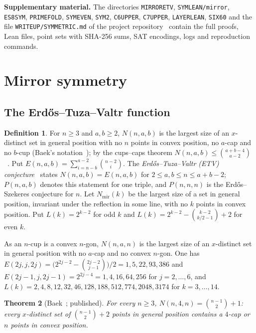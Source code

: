 \documentclass[10pt]{article}
\newtheorem{theorem}{Theorem}[section]
\theoremstyle{definition}
\newtheorem{definition}[theorem]{Definition}
\theoremstyle{remark}
\newcommand{\Nm}{N_{\mathrm{mir}}}
\newcommand{\dirn}[1]{{\upshape\nolinkurl{#1}}}
\begin{document}
\noindent\textbf{Supplementary material.} The directories \dirn{MIRRORETV}, \dirn{SYMLEAN/mirror}, \dirn{ES8SYM},
\dirn{PRIMEFOLD}, \dirn{SYMEVEN}, \dirn{SYM2}, \dirn{C6UPPER}, \dirn{C7UPPER}, \dirn{LAYERLEAN}, \dirn{SIX60} and the file
\dirn{WRITEUP/SYMMETRIC.md} of the project repository~\cite{Supp} contain
the full proofs, Lean files, point sets with SHA-256 sums, SAT encodings, logs and reproduction commands.

\section{Mirror symmetry}\label{sec:mirror}

\subsection{The Erd\H{o}s--Tuza--Valtr function}

\begin{definition}
For $n\ge3$ and $a,b\ge2$, $N(n,a,b)$ is the largest size of an $x$-distinct set in general position with no $n$ points
in convex position, no $a$-cap and no $b$-cup (Baek's notation~\cite[Def.~1.3]{Bae25}); by the cups--caps theorem
$N(n,a,b)\le\binom{a+b-4}{a-2}$~\cite{ES35}. Put $E(n,a,b)=\sum_{i=n-b}^{a-2}\binom{n-2}{i}$. The
\emph{Erd\H{o}s--Tuza--Valtr (ETV) conjecture}~\cite{ETV96} states $N(n,a,b)=E(n,a,b)$ for $2\le a,b\le n\le a+b-2$;
$P(n,a,b)$ denotes this statement for one triple, and $P(n,n,n)$ is the Erd\H{o}s--Szekeres conjecture for $n$. Let
$\Nm(k)$ be the largest size of a set in general position, invariant under the reflection in some line, with no $k$
points in convex position. Put $L(k)=2^{k-2}$ for odd $k$ and $L(k)=2^{k-2}-\binom{k-2}{k/2-1}+2$ for even $k$.
\end{definition}

As an $n$-cup is a convex $n$-gon, $N(n,a,n)$ is the largest size of an $x$-distinct set in general position with no
$a$-cap and no convex $n$-gon. One has $E(2j,j,2j)=\bigl(2^{2j-2}-\binom{2j-2}{j-1}\bigr)/2=1,5,22,93,386$ and
$E(2j-1,j,2j-1)=2^{2j-4}=1,4,16,64,256$ for $j=2,\dots,6$, and $L(k)=2,4,8,12,32,46,128,188,512,774,2048,3174$ for
$k=3,\dots,14$.

\begin{theorem}[Baek~{\cite[Thm.~1.6]{Bae25}}; published]\label{thm:baek}
For every $n\ge3$, $N(n,4,n)=\binom{n-1}{2}+1$: every $x$-distinct set of $\binom{n-1}{2}+2$ points in general position
contains a $4$-cap or $n$ points in convex position.
\end{theorem}
\end{document}
